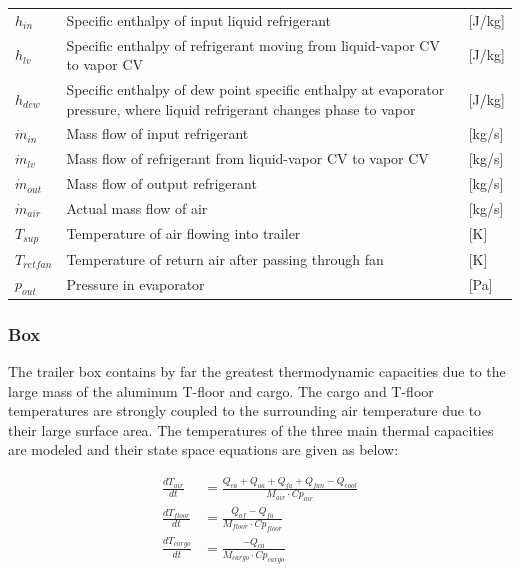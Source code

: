 \begin{center}
\begin{tabular}{l p{10cm} l}
		$h_{in} $					& Specific enthalpy of input liquid refrigerant 			& [\si{J}/\si{kg}] \\	
		$h_{lv} $					& Specific enthalpy of refrigerant moving from liquid-vapor CV to vapor CV						& [\si{J}/\si{kg}] \\
		$h_{dew}$					& Specific enthalpy of dew point specific enthalpy at evaporator pressure, where liquid refrigerant changes phase to vapor		& [\si{J}/\si{kg}] 		\\	
		$\dot{m}_{in} $				& Mass flow of input refrigerant 							& [\si{kg}/\si{s}] \\	
		$\dot{m}_{lv} $				& Mass flow of refrigerant from liquid-vapor CV to vapor CV	& [\si{kg}/\si{s}] \\	
		$\dot{m}_{out} $			& Mass flow of output refrigerant							& [\si{kg}/\si{s}] \\	
		$\dot{m}_{air}$				& Actual mass flow of air									& [\si{kg}/\si{s}] \\				
		$T_{sup} $					& Temperature of air flowing into trailer					& [\si{K}] \\	
		$T_{retfan}$				& Temperature of return air after passing through fan		& [\si{K}] \\	
		$ p_{out} 	$				& Pressure in evaporator									& [\si{Pa}] \\	
	\end{tabular}
\end{center}


\subsubsection{Box}
The trailer box contains by far the greatest thermodynamic capacities due to the large mass of the aluminum T-floor and cargo. The cargo and T-floor temperatures are strongly coupled to the surrounding air temperature due to their large surface area. The temperatures of the three main thermal capacities are modeled and their state space equations are given as below:

\begin{align}
	\frac{dT_{air}}{dt} & = \frac{Q_{ca} + Q_{aa} + Q_{fa} + Q_{fan} -Q_{cool}}{M_{air} \cdot Cp_{air}} \\
	\frac{dT_{floor}}{dt} & = \frac{Q_{af} - Q_{fa}}{M_{floor} \cdot Cp_{floor}} \\
	\frac{dT_{cargo}}{dt} & = \frac{-Q_{ca}}{M_{cargo} \cdot Cp_{cargo}}
\end{align}

